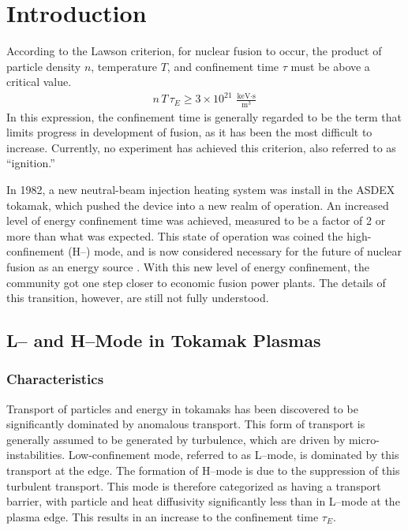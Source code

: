 \chapter{Introduction}\label{chapter:introduction}
According to the Lawson criterion, for nuclear fusion to occur, the product of particle density $n$, temperature $T$, and confinement time $\tau$ must be above a critical value.
\begin{align} %
	n\,T\,\tau_E \geq 3\times 10^{21}~\frac{\text{keV}\cdot\text{s}}{\text{m}^3}
\end{align}
In this expression, the confinement time is generally regarded to be the term that limits progress in development of fusion, as it has been the most difficult to increase.
Currently, no experiment has achieved this criterion, also referred to as ``ignition.''

In 1982, a new neutral-beam injection heating system was install in the ASDEX tokamak, which pushed the device into a new realm of operation.
An increased level of energy confinement time was achieved, measured to be a factor of 2 or more than what was expected.
This state of operation was coined the high-confinement (H--) mode, and is now considered necessary for the future of nuclear fusion as an energy source \cite{arnoux_how_2009, wagner_development_1984}.
With this new level of energy confinement, the community got one step closer to economic fusion power plants.
The details of this transition, however, are still not fully understood.

\section{L-- and H--Mode in Tokamak Plasmas}\label{sec:L_H_mode}
\subsection{Characteristics}\label{ssec:characteristics}
Transport of particles and energy in tokamaks has been discovered to be significantly dominated by anomalous transport.
This form of transport is generally assumed to be generated by turbulence, which are driven by micro-instabilities.
Low-confinement mode, referred to as L--mode, is dominated by this transport at the edge.
The formation of H--mode is due to the suppression of this turbulent transport.
This mode is therefore categorized as having a transport barrier, with particle and heat diffusivity significantly less than in L--mode at the plasma edge.
This results in an increase to the confinement time $\tau_E$.

